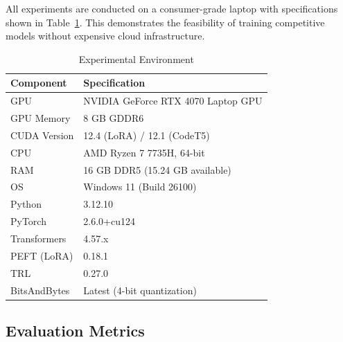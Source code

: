 \documentclass[conference]{IEEEtran}
\begin{document}
All experiments are conducted on a consumer-grade laptop with specifications shown in Table~\ref{tab:hardware}. This demonstrates the feasibility of training competitive models without expensive cloud infrastructure.

\begin{table}[htbp]
\caption{Experimental Environment}
\begin{center}
\begin{tabular}{|l|l|}
\hline
\textbf{Component} & \textbf{Specification} \\
\hline
GPU & NVIDIA GeForce RTX 4070 Laptop GPU \\
GPU Memory & 8 GB GDDR6 \\
CUDA Version & 12.4 (LoRA) / 12.1 (CodeT5) \\
CPU & AMD Ryzen 7 7735H, 64-bit \\
RAM & 16 GB DDR5 (15.24 GB available) \\
\hline
OS & Windows 11 (Build 26100) \\
Python & 3.12.10 \\
PyTorch & 2.6.0+cu124 \\
Transformers & 4.57.x \\
PEFT (LoRA) & 0.18.1 \\
TRL & 0.27.0 \\
BitsAndBytes & Latest (4-bit quantization) \\
\hline
\end{tabular}
\label{tab:hardware}
\end{center}
\end{table}

\subsection{Evaluation Metrics}
\end{document}

